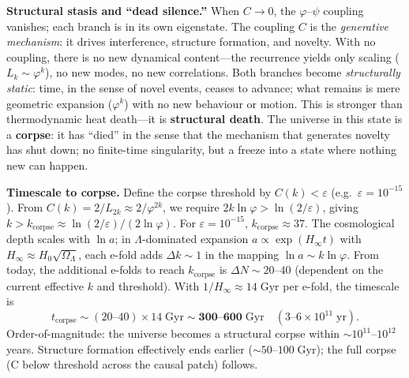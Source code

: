 \documentclass[12pt,a4paper]{article}
\begin{document}
\medskip
\noindent\textbf{Structural stasis and ``dead silence.''} When $C \to 0$, the $\varphi$--$\psi$ coupling vanishes; each branch is in its own eigenstate. The coupling $C$ is the \emph{generative mechanism}: it drives interference, structure formation, and novelty. With no coupling, there is no new dynamical content---the recurrence yields only scaling ($L_k \sim \varphi^k$), no new modes, no new correlations. Both branches become \emph{structurally static}: time, in the sense of novel events, ceases to advance; what remains is mere geometric expansion ($\varphi^k$) with no new behaviour or motion. This is stronger than thermodynamic heat death---it is \textbf{structural death}. The universe in this state is a \textbf{corpse}: it has ``died'' in the sense that the mechanism that generates novelty has shut down; no finite-time singularity, but a freeze into a state where nothing new can happen.

\medskip
\noindent\textbf{Timescale to corpse.} Define the corpse threshold by $C(k) < \varepsilon$ (e.g.\ $\varepsilon = 10^{-15}$). From $C(k) = 2/L_{2k} \approx 2/\varphi^{2k}$, we require $2k\ln\varphi > \ln(2/\varepsilon)$, giving $k > k_{\mathrm{corpse}} \approx \ln(2/\varepsilon)/(2\ln\varphi)$. For $\varepsilon = 10^{-15}$, $k_{\mathrm{corpse}} \approx 37$. The cosmological depth scales with $\ln a$; in $\Lambda$-dominated expansion $a \propto \exp(H_\infty t)$ with $H_\infty \approx H_0\sqrt{\Omega_\Lambda}$, each e-fold adds $\Delta k \sim 1$ in the mapping $\ln a \sim k\ln\varphi$. From today, the additional e-folds to reach $k_{\mathrm{corpse}}$ is $\Delta N \sim 20$--$40$ (dependent on the current effective $k$ and threshold). With $1/H_\infty \approx 14\;\mathrm{Gyr}$ per e-fold, the timescale is
\begin{equation}
t_{\mathrm{corpse}} \sim (20\text{--}40) \times 14\;\mathrm{Gyr} \sim \mathbf{300\text{--}600\;\mathrm{Gyr}} \quad (3\text{--}6 \times 10^{11}\;\mathrm{yr}).
\end{equation}
Order-of-magnitude: the universe becomes a structural corpse within $\sim 10^{11}$--$10^{12}$ years. Structure formation effectively ends earlier ($\sim 50$--$100\;\mathrm{Gyr}$); the full corpse (C below threshold across the causal patch) follows.
\end{document}
